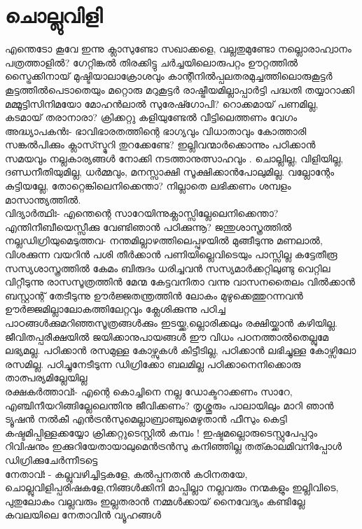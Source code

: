 \chapter{ചൊല്ലുവിളി}
\obeylines
\noindent
എന്തെടോ കൂവേ  ഇന്നു ക്ലാസുണ്ടോ സഖാക്കളെ,
വല്ലതുമുണ്ടോ നല്ലൊരാഹ്വാനം പത്രത്താളിൽ? 
ഗേറ്റിങ്കൽ തിരക്കിട്ടു ചർച്ചയിലൊരുപറ്റം  
ഊറ്റത്തിൽ സ്ട്രൈക്കിനായ് മുഷ്ടിയാലാക്രോശവും 
കാന്റീനിൽപ്പലതരമുച്ചത്തിലൊരുകൂട്ടർ  
കൂട്ടത്തിൽപെടാതെയും മറ്റൊരു മറുകൂട്ടർ 
രാഷ്ട്രീയമില്ലാപ്പാർട്ടി പദ്ധതി തയ്യാറാക്കി  
മമ്മൂട്ടിസിനിമയോ മോഹൻലാൽ സുരേഷ്ഗോപി? 
റൊക്കമായ് പണമില്ല, കടമായ് തരാനാരാ? 
ക്രിക്കറ്റു കളിയുണ്ടേൽ വീട്ടിലെത്തണം വേഗം  \\
അദ്ധ്യാപകൻഃ-  
ഭാവിഭാരതത്തിന്റെ ഭാഗ്യവും വിധാതാവും
കോത്താരി സങ്കൽപിക്കും ക്ലാസ്സ്മുറി തുറക്കേണ്ടേ? 
ഇല്ലിവന്മാർക്കൊന്നും പഠിക്കാൻ സമയവും  
നല്ലകാര്യങ്ങൾ നോക്കി നടത്താനുത്സാഹവും .
ചൊല്ലില്ല, വിളിയില്ല, ദണ്ഡനീതിയുമില്ല, 
ധർമ്മവും, മനസ്സാക്ഷി സൂക്ഷിക്കാൻപോലുമില്ല. 
വല്ലോന്റേം കുട്ടിയല്ലേ, തോറ്റെങ്കിലെനിക്കെന്താ? 
നില്ലാതെ ലഭിക്കണം ശമ്പളം മാസാന്ത്യത്തിൽ. \\
വിദ്യാർത്ഥിഃ- 
എന്തെന്റെ സാറേയിന്നുക്ലാസ്സില്ലേലെനിക്കെന്താ? 
എന്തിനീബീയെസ്സീക്കു വേണ്ടിഞാൻ പഠിക്കുന്നൂ? 
ജന്തുശാസ്ത്രത്തിൽ നല്ലഡിഗ്രിയുമെടുത്തവ- 
നന്തമില്ലാഴത്തിലെപ്പുഴയിൽ മുങ്ങീടുന്നു 
മണലാൽ, വിശക്കുന്ന വയറിൻ പശി തീർക്കാൻ 
പണിയില്ലെവിടെയും പാസ്സില്ല കട്ടേതീരൂ 
സസ്യശാസ്ത്രത്തിൽ കേമം ബിരുദം ധരിച്ചവൻ 
സസ്യമാർക്കറ്റിലുണ്ടു  വെറ്റില വിറ്റീടുന്നു 
രാസസൂത്രത്തിൻ മേന്മ കേട്ടവനിതാ വന്നു 
വാസനതൈലം വിൽക്കാൻ ബസ്റ്റാന്റ് തേടീടുന്നു 
ഊർജ്ജതന്ത്രത്തിൻ ലോകം മുഴുക്കെത്തുറന്നവൻ 
ഊർജ്ജമില്ലാലോകത്തിലേറ്റവും ക്ലേശിക്കുന്നു 
പഠിച്ച പാഠങ്ങൾക്കുമറിഞ്ഞസൂത്രങ്ങൾക്കും  
ഇടയ്ക്ക,ല്ലൊരിക്കലും രക്ഷിയ്ക്കാൻ കഴിയില്ല. 
ജീവിതപ്പരീക്ഷയിൽ ജയിക്കാനുപായങ്ങൾ 
ഈ വിധം പഠനത്താൽതെല്ലുമേ ലഭ്യമല്ല.
പഠിക്കാൻ രസമുള്ള കോഴ്സുകൾ കിട്ടീടില്ല,
പഠിക്കാൻ ലഭിച്ചുള്ള കോഴ്സിലോ രസമില്ല. 
പഠിച്ചുനേടീടുന്ന ഡിഗ്രിക്കോ ബലമില്ല 
പഠിക്കാനെനിക്കൊരു താത്പര്യമില്ലേയില്ല \\
രക്ഷകർത്താവ്ഃ- 
എന്റെ കൊച്ചിനെ നല്ല ഡോക്ടറാക്കണം സാറേ, 
എഞ്ചിനീയറിങ്ങില്ലേലെന്തിനു ജീവിക്കണം? 
തൃശ്ശൂരും പാലായിലും മാറി ഞാൻ ട്യൂഷൻ നൽകീ 
എൻട്രൻസുമെല്ലാബ്രാഞ്ചുമെഴുതാൻ ഫീസും കെട്ടി 
കഷ്ടമിപ്പിള്ളക്കയ്യോ ക്രിക്കറ്റുടെസ്റ്റിൽ കമ്പം !
ഇഷ്ടമല്ലൊരുടെസ്റ്റുപേപ്പറും റിവിഷനും  
ഇക്കുറിയേതായാലുമെൻട്രൻസു കനിഞ്ഞില്ല 
തത്കാലമിവനിപ്പോൾ ഡിഗ്രിക്കുചേർന്നീടട്ടെ\\ 
നേതാവ്ഃ - 
കല്ലുവഴിച്ചിട്ടകളേ, കൽപ്പനതൻ കഠിനതയേ, 
ചൊല്ലുവിളിപ്പരിഷകളേ,നിങ്ങൾക്കിനി മാപ്പില്ലാ 
നല്ലവരും നന്മകളും ഇല്ലിവിടെ, പുതുലോകം 
വല്ലവരും ഇല്ലതരാൻ നമ്മൾക്കായ് നൈവേദ്യം  
കണ്ടില്ലേ കവലയിലെ നേതാവിൻ വ്യൂഹങ്ങൾ
